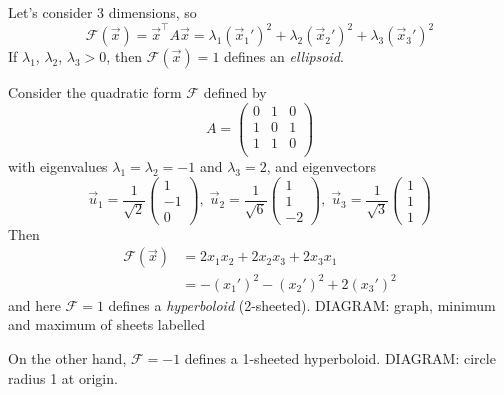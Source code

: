 \documentclass{../../template/note}
\begin{document}

    Let's consider 3 dimensions, so
    \[
        \mathcal F(\vec x) = \vec x^\intercal A \vec x = \lambda_1(\vec x_1')^2 + \lambda_2(\vec x_2')^2 + \lambda_3(\vec x_3')^2
    \]
    If \(\lambda_1\), \(\lambda_2\), \(\lambda_3 > 0\), then \(\mathcal F(\vec x) = 1\) defines an \emph{ellipsoid}.

    \begin{example}
        Consider the quadratic form \(\mathcal F\) defined by
        \[
            A = \begin{pmatrix}
             0 & 1 & 0 \\
             1 & 0 & 1 \\
             1 & 1 & 0 \\
            \end{pmatrix}
        \]
        with eigenvalues \(\lambda_1 = \lambda_2 = -1\) and \(\lambda_3 = 2\), and eigenvectors 
        \[
            \vec u_1 = \frac{1}{\sqrt 2} \begin{pmatrix}
                1 \\
                -1 \\
                0
            \end{pmatrix}, \; \vec u_2 = \frac{1}{\sqrt 6} \begin{pmatrix}
                1 \\
                1 \\
                -2
            \end{pmatrix}, \; \vec u_3 = \frac{1}{\sqrt 3} \begin{pmatrix}
                1 \\
                1 \\
                1
            \end{pmatrix}
        \]
        Then
        \begin{align*}
            \mathcal F(\vec x) &= 2x_1x_2 + 2x_2x_3 + 2x_3x_1 \\
            &= -(x_1')^2 - (x_2')^2 + 2(x_3')^2
        \end{align*}
        and here \(\mathcal F = 1\) defines a \emph{hyperboloid} (2-sheeted).
        DIAGRAM: graph, minimum and maximum of sheets labelled

        On the other hand, \(\mathcal F = -1\) defines a 1-sheeted hyperboloid.
        DIAGRAM: circle radius 1 at origin.
    \end{example}
    
\end{document}
